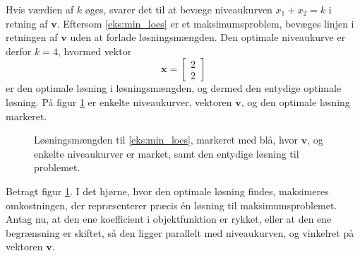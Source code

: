 Hvis værdien af $k$ øges, svarer det til at bevæge niveaukurven $x_1+x_2=k$ i retning af $\textbf{v}$.
Eftersom \ref{eks:min_loes} er et maksimumsproblem, bevæges linjen i retningen af $\textbf{v}$ uden at forlade løsningsmængden. 
Den optimale niveaukurve er derfor $k = 4$, hvormed vektor
%
$$
\textbf{x}=
\begin{bmatrix}
2\\2
\end{bmatrix}
$$
%
er den optimale løsning i løsningsmængden, og dermed den entydige optimale løsning. 
På figur \ref{fig:opti_loes} er enkelte niveaukurver, vektoren $\mathbf{v}$, og den optimale løsning markeret.
%
\begin{figure}[H]
\centering
%
\caption{Løsningsmængden til \ref{eks:min_loes}, markeret med blå, hvor $\mathbf{v}$, og enkelte niveaukurver er market, samt den entydige løsning til problemet.}
%
\label{fig:opti_loes}
\end{figure}
\noindent
%
Betragt figur \ref{fig:opti_loes}. 
I det hjørne, hvor den optimale løsning findes, maksimeres omkostningen, der repræsenterer præcis én løsning til maksimumsproblemet. 
Antag nu, at den ene koefficient i objektfunktion er rykket, eller at den ene begrænsning er skiftet, så den ligger parallelt med niveaukurven, og vinkelret på vektoren $\textbf{v}$.
